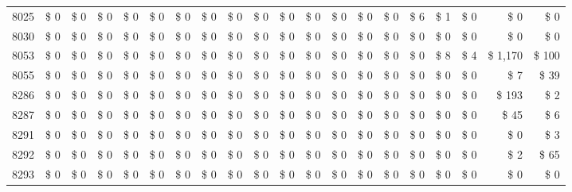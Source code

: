 \begin{longtable}{lrrrrrrrrrrrrrrrrrrr}
8025 & \$ 0 & \$ 0 & \$ 0 & \$ 0 & \$ 0 & \$ 0 & \$ 0 & \$ 0 & \$ 0 & \$ 0 & \$ 0 & \$ 0 & \$ 0 & \$ 0 & \$ 6 & \$ 1 & \$ 0 & \$ 0 & \$ 0 \\
8030 & \$ 0 & \$ 0 & \$ 0 & \$ 0 & \$ 0 & \$ 0 & \$ 0 & \$ 0 & \$ 0 & \$ 0 & \$ 0 & \$ 0 & \$ 0 & \$ 0 & \$ 0 & \$ 0 & \$ 0 & \$ 0 & \$ 0 \\
8053 & \$ 0 & \$ 0 & \$ 0 & \$ 0 & \$ 0 & \$ 0 & \$ 0 & \$ 0 & \$ 0 & \$ 0 & \$ 0 & \$ 0 & \$ 0 & \$ 0 & \$ 0 & \$ 8 & \$ 4 & \$ 1,170 & \$ 100 \\
8055 & \$ 0 & \$ 0 & \$ 0 & \$ 0 & \$ 0 & \$ 0 & \$ 0 & \$ 0 & \$ 0 & \$ 0 & \$ 0 & \$ 0 & \$ 0 & \$ 0 & \$ 0 & \$ 0 & \$ 0 & \$ 7 & \$ 39 \\
8286 & \$ 0 & \$ 0 & \$ 0 & \$ 0 & \$ 0 & \$ 0 & \$ 0 & \$ 0 & \$ 0 & \$ 0 & \$ 0 & \$ 0 & \$ 0 & \$ 0 & \$ 0 & \$ 0 & \$ 0 & \$ 193 & \$ 2 \\
8287 & \$ 0 & \$ 0 & \$ 0 & \$ 0 & \$ 0 & \$ 0 & \$ 0 & \$ 0 & \$ 0 & \$ 0 & \$ 0 & \$ 0 & \$ 0 & \$ 0 & \$ 0 & \$ 0 & \$ 0 & \$ 45 & \$ 6 \\
8291 & \$ 0 & \$ 0 & \$ 0 & \$ 0 & \$ 0 & \$ 0 & \$ 0 & \$ 0 & \$ 0 & \$ 0 & \$ 0 & \$ 0 & \$ 0 & \$ 0 & \$ 0 & \$ 0 & \$ 0 & \$ 0 & \$ 3 \\
8292 & \$ 0 & \$ 0 & \$ 0 & \$ 0 & \$ 0 & \$ 0 & \$ 0 & \$ 0 & \$ 0 & \$ 0 & \$ 0 & \$ 0 & \$ 0 & \$ 0 & \$ 0 & \$ 0 & \$ 0 & \$ 2 & \$ 65 \\
8293 & \$ 0 & \$ 0 & \$ 0 & \$ 0 & \$ 0 & \$ 0 & \$ 0 & \$ 0 & \$ 0 & \$ 0 & \$ 0 & \$ 0 & \$ 0 & \$ 0 & \$ 0 & \$ 0 & \$ 0 & \$ 0 & \$ 0 \\
\end{longtable}
